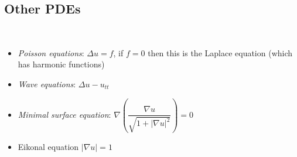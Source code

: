 \subsection{Other PDEs}\hfill\\
\begin{itemize}
  \item \textit{Poisson equations}: $\Delta u = f$, if $f = 0$ then this is the Laplace equation (which has harmonic functions)
  \item \textit{Wave equations}: $\Delta u-u_{tt}$
  \item \textit{Minimal surface equation}: $\nabla\left(\dfrac{\nabla u}{\sqrt{1+\left|\nabla u\right|^2}}\right) = 0$
  \item Eikonal equation $\left|\nabla u\right| = 1$
\end{itemize}
